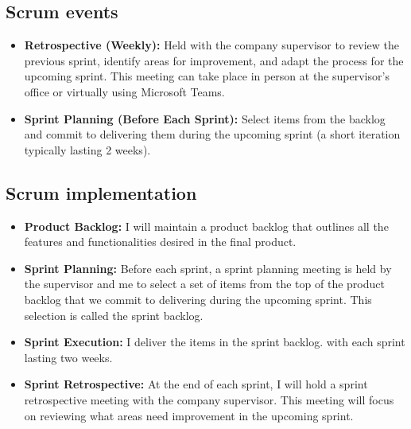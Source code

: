 \subsection{Scrum events}
\begin{itemize}
    \item \textbf{Retrospective (Weekly):} Held with the company supervisor to review the previous sprint, identify areas for improvement, and adapt the process for the upcoming sprint. This meeting can take place in person at the supervisor's office or virtually using Microsoft Teams.
    \item \textbf{Sprint Planning (Before Each Sprint):} Select items from the backlog and commit to delivering them during the upcoming sprint (a short iteration typically lasting 2 weeks).
\end{itemize}

\subsection{Scrum implementation}
\begin{itemize}
    \item \textbf{Product Backlog:} I will maintain a product backlog that outlines all the features and functionalities desired in the final product.
    \item \textbf{Sprint Planning:} Before each sprint, a sprint planning meeting is held by the supervisor and me to select a set of items from the top of the product backlog that we commit to delivering during the upcoming sprint. This selection is called the sprint backlog.
    \item \textbf{Sprint Execution:} I deliver the items in the sprint backlog. with each sprint lasting two weeks.
    \item \textbf{Sprint Retrospective:} At the end of each sprint, I will hold a sprint retrospective meeting with the company supervisor. This meeting will focus on reviewing what areas need improvement in the upcoming sprint.
\end{itemize}


